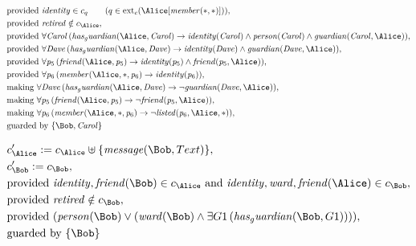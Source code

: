 \begin{align*}
&
\text{provided } 
\mathit{
identity
}
 \in c_
q
 \qquad (
q \in 
\mathrm{ext}_c(
\Alice
[
\mathit{
member
}
(
\ast
,
\ast
)
]
)
)
,\\
&
\text{provided } 
\mathit{
retired
}
 \notin c_
{
\Alice
}
,\\
&
\text{provided } 
\forall 
\mathit{Carol}
\,(
\mathit{
has_guardian
}
(
\Alice
,
\mathit{Carol}
)
\rightarrow
\mathit{
identity
}
(
\mathit{Carol}
)
\land
\mathit{
person
}
(
\mathit{Carol}
)
\land
\mathit{
guardian
}
(
\mathit{Carol}
,
\Alice
)
)
,\\
&
\text{provided } 
\forall 
\mathit{Dave}
\,(
\mathit{
has_guardian
}
(
\Alice
,
\mathit{Dave}
)
\rightarrow
\mathit{
identity
}
(
\mathit{Dave}
)
\land
\mathit{
guardian
}
(
\mathit{Dave}
,
\Alice
)
)
,\\
&
\text{provided } 
\forall 
\mathit{p}_{
5
}
\,(
\mathit{
friend
}
(
\Alice
,
\mathit{p}_{
5
}
)
\rightarrow
\mathit{
identity
}
(
\mathit{p}_{
5
}
)
\land
\mathit{
friend
}
(
\mathit{p}_{
5
}
,
\Alice
)
)
,\\
&
\text{provided } 
\forall 
\mathit{p}_{
6
}
\,(
\mathit{
member
}
(
\Alice
,
\ast
,
\mathit{p}_{
6
}
)
\rightarrow
\mathit{
identity
}
(
\mathit{p}_{
6
}
)
)
,\\
&
\text{making } 
\forall 
\mathit{Dave}
\,(
\mathit{
has_guardian
}
(
\Alice
,
\mathit{Dave}
)
\rightarrow
\neg 
\mathit{
guardian
}
(
\mathit{Dave}
,
\Alice
)
)
,\\
&
\text{making } 
\forall 
\mathit{p}_{
5
}
\,(
\mathit{
friend
}
(
\Alice
,
\mathit{p}_{
5
}
)
\rightarrow
\neg 
\mathit{
friend
}
(
\mathit{p}_{
5
}
,
\Alice
)
)
,\\
&
\text{making } 
\forall 
\mathit{p}_{
6
}
\,(
\mathit{
member
}
(
\Alice
,
\ast
,
\mathit{p}_{
6
}
)
\rightarrow
\neg 
\mathit{
listed
}
(
\mathit{p}_{
6
}
,
\Alice
,
\ast
)
)
,\\
&
\text{guarded by } \{
\Bob
,
\mathit{Carol}
\}
\end{align*}

\begin{align*}
&
c'_
{
\Alice
}
 := 
c_
{
\Alice
}
 \uplus 
\{
\mathit{
message
}
(
\Bob
,
Text
)
\}
,\\
&
c'_
{
\Bob
}
 := 
c_
{
\Bob
}
,\\
&
\text{provided } 
\mathit{
identity
}
,
\mathit{
friend
}
(
\Bob
)
 \in c_
{
\Alice
}
 \text{ and } 
\mathit{
identity
}
,
\mathit{
ward
}
,
\mathit{
friend
}
(
\Alice
)
 \in c_
{
\Bob
}
,\\
&
\text{provided } 
\mathit{
retired
}
 \notin c_
{
\Bob
}
,\\
&
\text{provided } 
(
\mathit{
person
}
(
\Bob
)
\lor
(
\mathit{
ward
}
(
\Bob
)
\land
\exists 
G1
\,(
\mathit{
has_guardian
}
(
\Bob
,
G1
)
)
)
)
,\\
&
\text{guarded by } \{
\Bob
\}
\end{align*}
